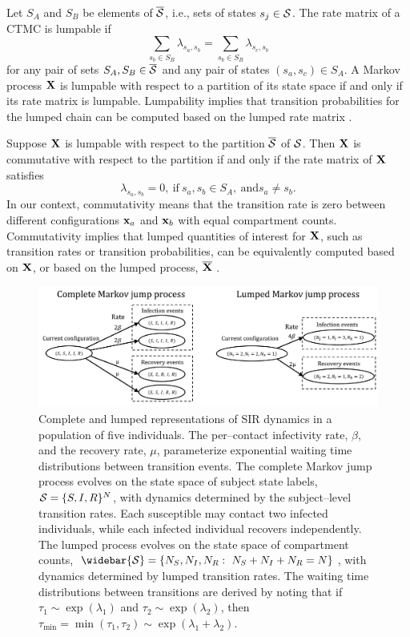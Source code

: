 Let $ S_A $ and $ S_B $ be elements of $ \overline{\mathcal{S}} $, i.e., sets of states $ s_j \in \mathcal{S} $. The rate matrix of a CTMC is lumpable if
\begin{equation*}
\sum_{s_b \in S_B}\lambda_{s_a,s_b} = \sum_{s_b \in S_B}\lambda_{s_c,s_b}
\end{equation*}
for any pair of sets $S_A,S_B \in \overline{\mathcal{S}} $ and any pair of states  $(s_a, s_c) \in S_A$. A Markov process $ \mathbf{X} $ is lumpable with respect to a partition of its state space if and only if its rate matrix is lumpable. Lumpability implies that transition probabilities for the lumped chain can be computed based on the lumped rate matrix  \cite{tian2006lumpability}.

Suppose $ \mathbf{X} $ is lumpable with respect to the partition $ \overline{\mathcal{S}} $ of $ \mathcal{S} $. Then $ \mathbf{X} $ is commutative with respect to the partition if and only if the rate matrix of $ \mathbf{X} $ satisfies
$$\lambda_{s_a,s_b} = 0,\ \text{if}\ s_a,s_b\in S_A,\ \text{and} s_a\neq s_b. $$ In our context, commutativity means that the transition rate is zero between different configurations $ \mathbf{x}_a $ and $ \mathbf{x}_b $ with equal compartment counts. Commutativity implies that lumped quantities of interest for $ \mathbf{X} $, such as transition rates or transition probabilities, can be equivalently computed based on $ \mathbf{X} $, or based on the lumped process, $ \overline{\mathbf{X}} $ \cite{tian2006lumpability}. 

\begin{figure}
	\centering
	\includegraphics[width=\linewidth]{figures/SIR_representations}
	\caption{Complete and lumped representations of SIR dynamics in a population of five individuals. The per--contact infectivity rate, $ \beta $, and the recovery rate, $ \mu $, parameterize exponential waiting time distributions between transition events. The complete Markov jump process evolves on the state space of subject state labels, $ \mathcal{S} = \lbrace S,I,R\rbrace^N $, with dynamics determined by the subject--level transition rates. Each susceptible may contact two infected individuals, while each infected individual recovers independently. The lumped process evolves on the state space of compartment counts, $ \widebar{\mcS} = \lbrace N_S,N_I,N_R:\ N_S + N_I+N_R=N\rbrace $, with dynamics determined by lumped transition rates. The waiting time distributions between transitions are derived by noting that if $ \tau_1\sim \exp(\lambda_1) $ and $ \tau_2\sim\exp(\lambda_2) $, then $ \tau_{\min} = \min(\tau_1,\tau_2)\sim\exp(\lambda_1+\lambda_2) $.}
	\label{fig:sirrepresentations}
\end{figure}

